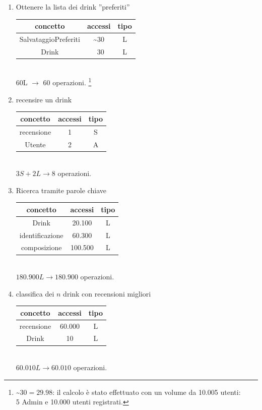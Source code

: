 \documentclass[a4paper,12pt]{report}
\begin{document}
\begin{enumerate}
    \item Ottenere la lista dei drink ”preferiti”\\
    \begin{tabular}{c|c|c}
    concetto & accessi & tipo\\
    \hline
        SalvataggioPreferiti & \textasciitilde 30 & L\\
        Drink & ~30 & L\\
    \hline
    \end{tabular}
    \\60L $\to$ 60 operazioni.
\footnote{\textasciitilde $30=29.98$: il calcolo è stato effettuato con un volume da 10.005 utenti: \\5 Admin e 10.000 utenti registrati.}

    \item recensire un drink\\
    \begin{tabular}{c|c|c}
    concetto & accessi & tipo\\
    \hline
        recensione & 1 & S\\
        Utente & 2 & A\\
    \hline
    \end{tabular}
    \\ $3S + 2L\to 8$ operazioni.

    \item Ricerca tramite parole chiave\\
    \begin{tabular}{c|c|c}
    concetto & accessi & tipo\\
    \hline
        Drink & 20.100 & L\\
        identificazione & 60.300 & L\\
        composizione & 100.500 & L\\
    \hline
    \end{tabular}
    \\ $180.900L\to180.900$ operazioni.

    \item classifica dei $n$ drink con recensioni migliori\\
        \begin{tabular}{c|c|c}
    concetto & accessi & tipo\\
    \hline
        recensione & 60.000 & L\\
        Drink & 10 & L\\
    \hline
    \end{tabular}
    \\ $60.010L\to60.010$ operazioni.


\end{enumerate}
\end{document}
